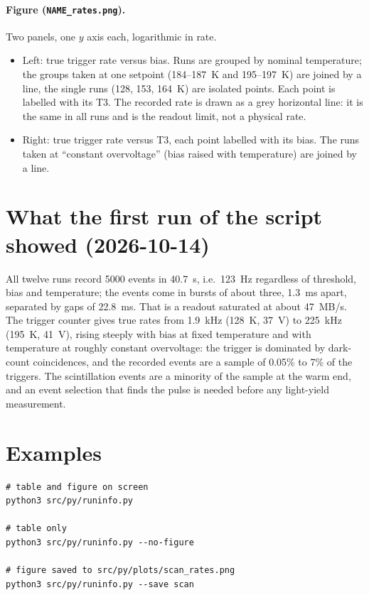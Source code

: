 \documentclass[11pt]{article}
\newcommand{\code}[1]{\texttt{#1}}
\begin{document}
\paragraph{Figure (\code{NAME\_rates.png}).} Two panels, one $y$ axis each,
logarithmic in rate.
\begin{itemize}
\item Left: true trigger rate versus bias. Runs are grouped by nominal
  temperature; the groups taken at one setpoint (184--187~K and 195--197~K)
  are joined by a line, the single runs (128, 153, 164~K) are isolated
  points. Each point is labelled with its T3. The recorded rate is drawn
  as a grey horizontal line: it is the same in all runs and is the readout
  limit, not a physical rate.
\item Right: true trigger rate versus T3, each point labelled with its
  bias. The runs taken at ``constant overvoltage'' (bias raised with
  temperature) are joined by a line.
\end{itemize}

\section{What the first run of the script showed (2026-10-14)}

All twelve runs record 5000 events in 40.7~s, i.e.\ 123~Hz regardless of
threshold, bias and temperature; the events come in bursts of about three,
1.3~ms apart, separated by gaps of 22.8~ms. That is a readout saturated at
about 47~MB/s. The trigger counter gives true rates from 1.9~kHz (128~K,
37~V) to 225~kHz (195~K, 41~V), rising steeply with bias at fixed
temperature and with temperature at roughly constant overvoltage: the
trigger is dominated by dark-count coincidences, and the recorded events
are a sample of 0.05\% to 7\% of the triggers. The scintillation events
are a minority of the sample at the warm end, and an event selection that
finds the pulse is needed before any light-yield measurement.

\section{Examples}

\begin{lstlisting}
# table and figure on screen
python3 src/py/runinfo.py

# table only
python3 src/py/runinfo.py --no-figure

# figure saved to src/py/plots/scan_rates.png
python3 src/py/runinfo.py --save scan
\end{lstlisting}
\end{document}
